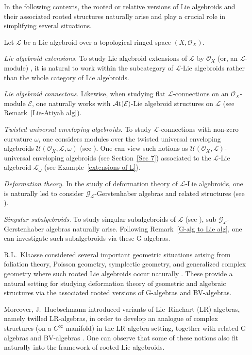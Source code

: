 \documentclass[pdftex]{sigma}
\numberwithin{equation}{section}
\theoremstyle{definition}
\begin{document}
In the following contexts, the rooted or relative versions of Lie algebroids and their associated rooted structures naturally arise and play a crucial role in simplifying several situations.

Let $\mathcal{L}$ be a Lie algebroid over a topological ringed space $(X,\mathcal{O}_X)$.

\emph{Lie algebroid extensions.} To study Lie algebroid extensions of $\mathcal{L}$ by $\mathcal{O}_X$ (or, an $\mathcal{L}$-module) \cite{AS, PT2}, it is natural to work within the subcategory of $\mathcal{L}$-Lie algebroids rather than the whole category of Lie algebroids.

\emph{Lie algebroid connectons.} Likewise, when studying flat $\mathcal{L}$-connections on an $\mathcal{O}_X$-module $\mathcal{E}$, one naturally works with $\mathcal{A}{\rm t}(\mathcal{E})$-Lie algebroid structures on $\mathcal{L}$ (see Remark~\ref{Lie-Atiyah alg}).

\emph{Twisted universal enveloping algebroids.} To study $\mathcal{L}$-connections with non-zero curvature $\omega$, one considers modules over the twisted universal enveloping algebroids $\mathcal{U}(\mathcal{O}_X, \mathcal{L}, \omega)$ (see \cite{HOM, PT2}).
One can view such notions as $\mathcal{U}(\mathcal{O}_X, \mathcal{L})$-universal enveloping algebroids (see Section~\ref{Sec 7}) associated to the $\mathcal{L}$-Lie algebroid $\mathcal{L}_{\omega}$ (see Example~\ref{extensions of L}).

\emph{Deformation theory.} In the study of deformation theory of $\mathcal{L}$-Lie algebroids, one is naturally led to consider $\mathcal{G}_{\mathcal{L}}$-Gerstenhaber algebras and related structures (see \cite{CV, TS}).

\emph{Singular subalgebroids.} To study singular subalgebroids of $\mathcal{L}$ (see \cite{MZ}), sub $\mathcal{G}_{\mathcal{L}}$-Gerstenhaber algebras naturally arise. Following Remark~\ref{G-alg to Lie alg}, one can investigate such subalgebroids via these G-algebras.

R.L.~Klaasse considered several important geometric situations arising from foliation theory, Poisson geometry, symplectic geometry, and generalized complex geometry where such rooted Lie algebroids occur naturally \cite{RK}. These provide a natural setting for studying deformation theory of geometric and algebraic structures via the associated rooted versions of G-algebras and BV-algebras.

Moreover, J.~Huebschmann introduced variants of Lie--Rinehart (LR) algebras, namely twilled LR-algebras, in order to develop an analogue of complex structures (on a $C^\infty$-manifold) in the LR-algebra setting, together with related G-algebras and BV-algebras \cite{twilled-JH}. One can observe that some of these notions also fit naturally into the framework of rooted Lie algebroids.
\end{document}
